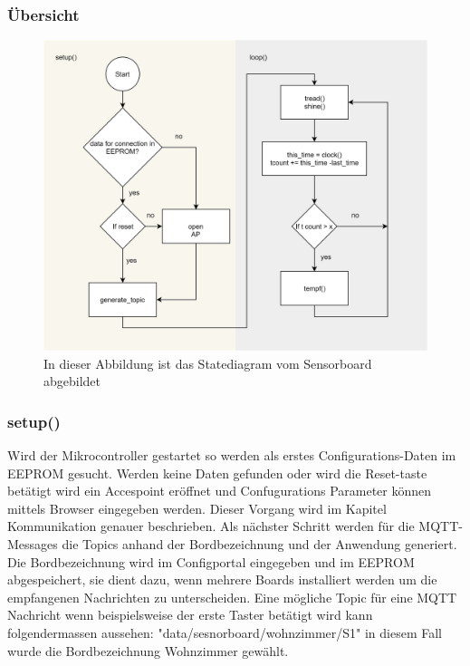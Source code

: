 \subsubsection{	Übersicht} 
\begin{figure}[H]
	\centering
	\includegraphics[width=\textwidth]{graphics/StatemaschineSensor.png}
	\caption{In dieser Abbildung ist das Statediagram vom Sensorboard abgebildet}
	\label{pic: statemaschine sensor}
\end{figure} 

\newpage

\subsubsection{setup()}\label{subsubsec: sensor setup}
Wird der Mikrocontroller gestartet so werden als erstes Configurations-Daten im EEPROM gesucht. Werden keine Daten gefunden oder wird die Reset-taste betätigt wird ein Accespoint eröffnet und Confugurations Parameter können mittels Browser eingegeben werden. Dieser Vorgang wird im Kapitel Kommunikation genauer beschrieben. Als nächster Schritt werden für die MQTT-Messages die Topics anhand der Bordbezeichnung und der Anwendung generiert. Die Bordbezeichnung wird im Configportal eingegeben und im EEPROM abgespeichert, sie dient dazu, wenn mehrere Boards installiert werden um die empfangenen Nachrichten zu unterscheiden. Eine mögliche Topic für eine MQTT Nachricht wenn beispielsweise der erste Taster betätigt wird kann folgendermassen aussehen: "data/sesnorboard/wohnzimmer/S1" in diesem Fall wurde die Bordbezeichnung Wohnzimmer gewählt. 

